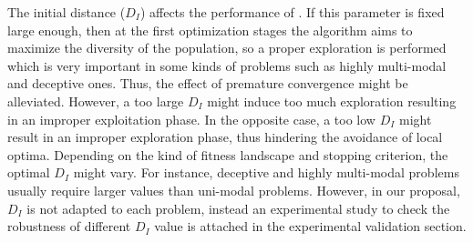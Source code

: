 %


The initial distance ($D_I$) affects the performance of \DEEDM{}.
%
If this parameter is fixed large enough, then at the first optimization stages the algorithm aims to maximize the diversity of the population, 
so a proper exploration is performed which is very important in some kinds of problems such as highly multi-modal and deceptive ones.
%
Thus, the effect of premature convergence might be alleviated.
%
However, a too large $D_I$ might induce too much exploration resulting in an improper exploitation phase.
%
In the opposite case, a too low $D_I$ might result in an improper exploration phase, thus hindering the avoidance of local optima.
%
Depending on the kind of fitness landscape and stopping criterion, the optimal $D_I$ might vary.
%
For instance, deceptive and highly multi-modal problems usually require larger values than uni-modal problems.
%
However, in our proposal, $D_I$ is not adapted to each problem, instead an experimental study to check the robustness
of different $D_I$ value is attached in the experimental validation section. 
%
%
%
%
%
%
%
%


